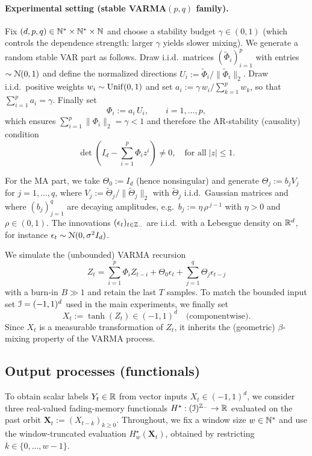 \paragraph{Experimental setting (stable VARMA$(p,q)$ family).}
Fix $(d,p,q)\in{\mathbb{N}}^\ast\times{\mathbb{N}}^\ast\times{\mathbb{N}}$ and choose a stability budget $\gamma\in(0,1)$
(which controls the dependence strength: larger $\gamma$ yields slower mixing).
We generate a random stable VAR part as follows.
Draw i.i.d.\ matrices $(\widetilde\Phi_i)_{i=1}^p$ with entries $\sim {\mathcal{N}}(0,1)$ and define the normalized directions
$U_i := \widetilde\Phi_i/\|\widetilde\Phi_i\|_2$.
Draw i.i.d.\ positive weights $w_i\sim\operatorname{Unif}(0,1)$ and set
$a_i := \gamma\, w_i/\sum_{k=1}^p w_k$, so that $\sum_{i=1}^p a_i=\gamma$.
Finally set
\[
\Phi_i := a_i\, U_i,\qquad i=1,\dots,p,
\]
which ensures $\sum_{i=1}^p\|\Phi_i\|_2=\gamma<1$ and therefore the AR-stability (causality) condition
$$\det(I_d-\sum_{i=1}^p \Phi_i z^i)\neq 0, \quad \text{for all} \; |z|\le 1.$$

For the MA part, we take $\Theta_0 := I_d$ (hence nonsingular) and generate
$\Theta_j := b_j V_j$ for $j=1,\dots,q$, where $V_j:=\widetilde\Theta_j/\|\widetilde\Theta_j\|_2$ with
$\widetilde\Theta_j$ i.i.d.\ Gaussian matrices and where $(b_j)_{j=1}^q$ are decaying amplitudes,
e.g.\ $b_j := \eta\,\rho^{\,j-1}$ with $\eta>0$ and $\rho\in(0,1)$.
The innovations $(\epsilon_t)_{t\in{\mathbb{Z}}_-}$ are i.i.d.\ with a Lebesgue density on $\mathbb{R}^d$,
for instance $\epsilon_t\sim{\mathcal{N}}(0,\sigma^2 I_d)$.

We simulate the (unbounded) VARMA recursion
\[
Z_t=\sum_{i=1}^p\Phi_i Z_{t-i}+\Theta_0\epsilon_t+\sum_{j=1}^q \Theta_j \epsilon_{t-j}
\]
with a burn-in $B\gg 1$ and retain the last $T$ samples.
To match the bounded input set ${\mathcal{I}}=(-1,1)^d$ used in the main experiments, we finally set
\[
X_t := \tanh(Z_t)\in(-1,1)^d \quad \text{(componentwise)}.
\]
Since $X_t$ is a measurable transformation of $Z_t$, it inherits the (geometric) $\beta$-mixing property of the VARMA process.


\subsection{Output processes (functionals)}
To obtain scalar labels $Y_t\in\mathbb{R}$ from vector inputs $X_t\in(-1,1)^d$, we consider three real-valued
fading-memory functionals $H^\star:({\mathcal{I}})^{{\mathbb{Z}}_-}\to\mathbb{R}$ evaluated on the past orbit
$\boldsymbol{X}_t := (X_{t-k})_{k\ge 0}$.
Throughout, we fix a window size $w\in{\mathbb{N}}^\ast$ and use the window-truncated evaluation
$H^\star_w(\boldsymbol{X}_t)$, obtained by restricting $k\in\{0,\dots,w-1\}$.


